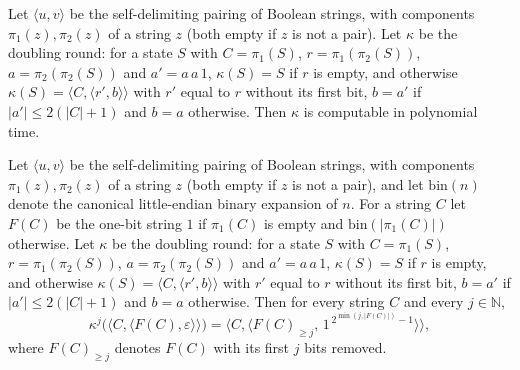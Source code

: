 \begin{theorem}
\label{Complexity.ladner_countStep_FP}
\leanok
{}
Let $\langle u,v\rangle$ be the self-delimiting pairing of Boolean strings, with components $\pi_1(z),\pi_2(z)$ of a string $z$ (both empty if $z$ is not a pair). Let $\kappa$ be the doubling round: for a state $S$ with $C=\pi_1(S)$,
$r=\pi_1(\pi_2(S))$, $a=\pi_2(\pi_2(S))$ and $a'=a\,a\,1$, $\kappa(S)=S$ if $r$ is empty, and
otherwise $\kappa(S)=\langle C,\langle r',b\rangle\rangle$ with $r'$ equal to $r$ without its first
bit, $b=a'$ if $|a'|\le 2(|C|+1)$ and $b=a$ otherwise. Then $\kappa$ is computable in polynomial
time.
\end{theorem}

\begin{theorem}
\label{Complexity.ladner_count_orbit}
\leanok
{}
Let $\langle u,v\rangle$ be the self-delimiting pairing of Boolean strings, with components $\pi_1(z),\pi_2(z)$ of a string $z$ (both empty if $z$ is not a pair), and let $\mathrm{bin}(n)$ denote the canonical little-endian binary expansion of $n$. For a string $C$ let $F(C)$ be the one-bit string $1$ if $\pi_1(C)$ is
empty and $\mathrm{bin}(|\pi_1(C)|)$ otherwise. Let $\kappa$ be the doubling round: for a state
$S$ with $C=\pi_1(S)$, $r=\pi_1(\pi_2(S))$, $a=\pi_2(\pi_2(S))$ and $a'=a\,a\,1$, $\kappa(S)=S$ if
$r$ is empty, and otherwise $\kappa(S)=\langle C,\langle r',b\rangle\rangle$ with $r'$ equal to $r$
without its first bit, $b=a'$ if $|a'|\le 2(|C|+1)$ and $b=a$ otherwise. Then for every string $C$
and every $j\in\mathbb N$,
\[
  \kappa^{j}\bigl(\langle C,\langle F(C),\varepsilon\rangle\rangle\bigr)
  =\bigl\langle C,\bigl\langle F(C)_{\ge j},\,1^{\,2^{\min(j,|F(C)|)}-1}\bigr\rangle\bigr\rangle,
\]
where $F(C)_{\ge j}$ denotes $F(C)$ with its first $j$ bits removed.
\end{theorem}

